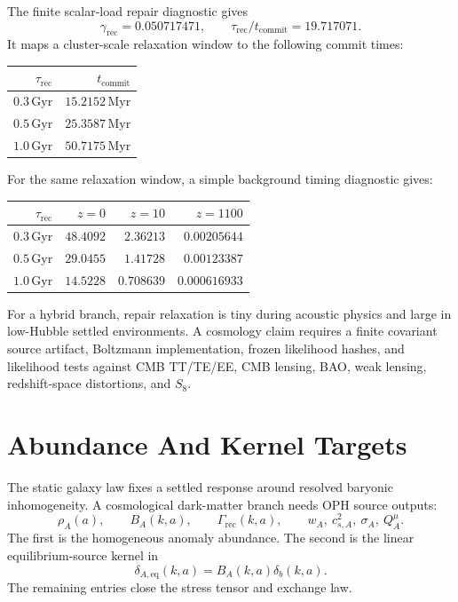\documentclass[11pt]{article}
\begin{document}
The finite scalar-load repair diagnostic gives
\[
  \gamma_{\mathrm{rec}}=0.050717471,
  \qquad
  \tau_{\mathrm{rec}}/t_{\mathrm{commit}}=19.717071 .
\]
It maps a cluster-scale relaxation window to the following commit times:
\begin{center}
\begin{tabular}{@{}rr@{}}
\toprule
\(\tau_{\mathrm{rec}}\) & \(t_{\mathrm{commit}}\) \\
\midrule
\(0.3\,\mathrm{Gyr}\) & \(15.2152\,\mathrm{Myr}\) \\
\(0.5\,\mathrm{Gyr}\) & \(25.3587\,\mathrm{Myr}\) \\
\(1.0\,\mathrm{Gyr}\) & \(50.7175\,\mathrm{Myr}\) \\
\bottomrule
\end{tabular}
\end{center}
For the same relaxation window, a simple background timing diagnostic gives:
\begin{center}
\begin{tabular}{@{}rrrr@{}}
\toprule
\(\tau_{\mathrm{rec}}\) & \(z=0\) & \(z=10\) & \(z=1100\) \\
\midrule
\(0.3\,\mathrm{Gyr}\) & \(48.4092\) & \(2.36213\) & \(0.00205644\) \\
\(0.5\,\mathrm{Gyr}\) & \(29.0455\) & \(1.41728\) & \(0.00123387\) \\
\(1.0\,\mathrm{Gyr}\) & \(14.5228\) & \(0.708639\) & \(0.000616933\) \\
\bottomrule
\end{tabular}
\end{center}
For a hybrid branch, repair relaxation is tiny during acoustic physics and
large in low-Hubble settled environments.  A cosmology claim requires a
finite covariant source artifact, Boltzmann implementation, frozen likelihood
hashes, and likelihood tests against CMB TT/TE/EE, CMB lensing, BAO, weak
lensing, redshift-space distortions, and \(S_8\).

\section{Abundance And Kernel Targets}

The static galaxy law fixes a settled response around resolved baryonic
inhomogeneity.  A cosmological dark-matter branch needs OPH source outputs:
\begin{equation}
  \rho_A(a),
  \qquad
  B_A(k,a),
  \qquad
  \Gamma_{\mathrm{rec}}(k,a),
  \qquad
  w_A,\ c_{s,A}^2,\ \sigma_A,\ Q_A^\mu .
\end{equation}
The first is the homogeneous anomaly abundance.  The second is the linear
equilibrium-source kernel in
\begin{equation}
  \delta_{A,\mathrm{eq}}(k,a)=B_A(k,a)\delta_b(k,a).
\end{equation}
The remaining entries close the stress tensor and exchange law.
\end{document}
